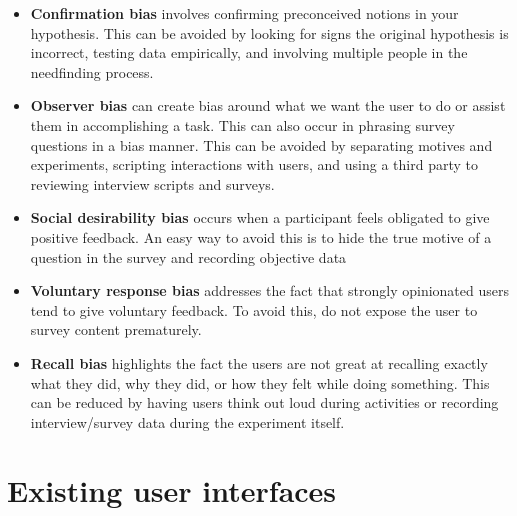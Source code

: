\begin{itemize}
\item
  \textbf{Confirmation bias} involves confirming preconceived notions in your hypothesis. This can be avoided by looking for signs the original hypothesis is incorrect, testing data empirically, and involving multiple people in the needfinding process.
\item
  \textbf{Observer bias} can create bias around what we want the user to do or assist them in accomplishing a task. This can also occur in phrasing survey questions in a bias manner. This can be avoided by separating motives and experiments, scripting interactions with users, and using a third party to reviewing interview scripts and surveys.
\end{itemize}

\clearpage

\begin{itemize}
\item
  \textbf{Social desirability bias} occurs when a participant feels obligated to give positive feedback. An easy way to avoid this is to hide the true motive of a question in the survey and recording objective data
\item
  \textbf{Voluntary response bias} addresses the fact that strongly opinionated users tend to give voluntary feedback. To avoid this, do not expose the user to survey content prematurely.
\item
  \textbf{Recall bias} highlights the fact the users are not great at recalling exactly what they did, why they did, or how they felt while doing something. This can be reduced by having users think out loud during activities or recording interview/survey data during the experiment itself.
\end{itemize}


\section{Existing user interfaces}

